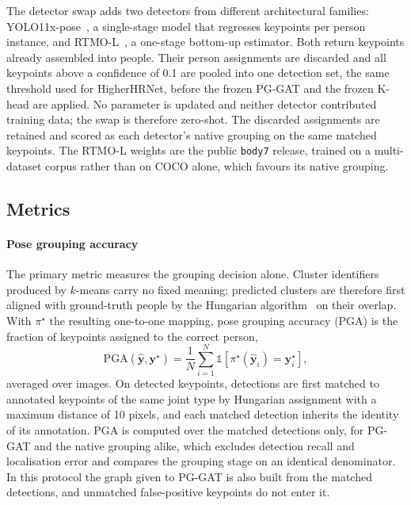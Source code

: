 The detector swap adds two detectors from different architectural families:
YOLO11x-pose~\citep{ultralytics2024yolo11}, a single-stage model that regresses keypoints per person instance,
and RTMO-L~\citep{lu2024rtmo}, a one-stage bottom-up estimator.
Both return keypoints already assembled into people.
Their person assignments are discarded and all keypoints above a confidence of 0.1 are pooled into one detection set,
the same threshold used for HigherHRNet, before the frozen PG-GAT and the frozen K-head are applied.
No parameter is updated and neither detector contributed training data; the swap is therefore zero-shot.
The discarded assignments are retained and scored as each detector's native grouping on the same matched keypoints.
The RTMO-L weights are the public \texttt{body7} release, trained on a multi-dataset corpus rather than on COCO alone,
which favours its native grouping.

\subsection{Metrics}
\label{sec:setup_metric}

\paragraph{Pose grouping accuracy}
The primary metric measures the grouping decision alone.
Cluster identifiers produced by $k$-means carry no fixed meaning;
predicted clusters are therefore first aligned with ground-truth people by the Hungarian
algorithm~\citep{kuhn1955hungarian} on their overlap.
With $\pi^\star$ the resulting one-to-one mapping,
pose grouping accuracy (PGA) is the fraction of keypoints assigned to the correct person,
\begin{equation}
    \mathrm{PGA}(\hat{\mathbf{y}}, \mathbf{y}^\star)
    = \frac{1}{N}
      \sum_{i=1}^{N}
      \mathbb{1}\!\left[
          \pi^\star(\hat{\mathbf{y}}_i) = \mathbf{y}^\star_i
      \right],
    \label{eq:pga}
\end{equation}
averaged over images.
On detected keypoints, detections are first matched to annotated keypoints of the same joint type by Hungarian
assignment with a maximum distance of 10 pixels,
and each matched detection inherits the identity of its annotation.
PGA is computed over the matched detections only, for PG-GAT and the native grouping alike,
which excludes detection recall and localisation error and compares the grouping stage on an identical denominator.
In this protocol the graph given to PG-GAT is also built from the matched detections,
and unmatched false-positive keypoints do not enter it.

